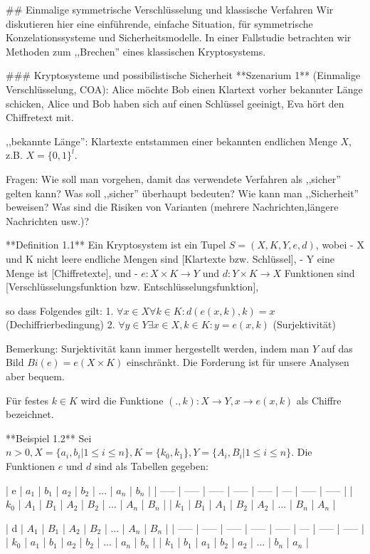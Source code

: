 \documentclass[a4paper]{article}
\begin{document}
\begin{multicols}{3}
## Einmalige symmetrische Verschlüsselung und klassische Verfahren
Wir diskutieren hier eine einführende, einfache Situation, für symmetrische Konzelationssysteme und Sicherheitsmodelle. In einer Fallstudie betrachten wir Methoden zum ,,Brechen'' eines klassischen Kryptosystems.

### Kryptosysteme und possibilistische Sicherheit
**Szenarium 1** (Einmalige Verschlüsselung, COA): Alice möchte Bob einen Klartext vorher bekannter Länge schicken, Alice und Bob haben sich auf einen Schlüssel geeinigt, Eva hört den Chiffretext mit.

,,bekannte Länge'': Klartexte entstammen einer bekannten endlichen Menge $X$, z.B. $X=\{0,1\}^l$.

Fragen: Wie soll man vorgehen, damit das verwendete Verfahren als ,,sicher'' gelten kann? Was soll ,,sicher'' überhaupt bedeuten? Wie kann man ,,Sicherheit'' beweisen? Was sind die Risiken von Varianten (mehrere Nachrichten,längere Nachrichten usw.)?

**Definition 1.1** Ein Kryptosystem ist ein Tupel $S=(X,K,Y,e,d)$, wobei
- X und K nicht leere endliche Mengen sind [Klartexte bzw. Schlüssel],
- Y eine Menge ist [Chiffretexte], und
- $e:X\times K\rightarrow Y$ und $d:Y\times K\rightarrow X$ Funktionen sind [Verschlüsselungsfunktion bzw. Entschlüsselungsfunktion],

so dass Folgendes gilt:
1. $\forall x\in X\forall k\in K:d(e(x,k),k) =x$ (Dechiffrierbedingung)
2. $\forall y\in Y\exists x\in X,k\in K:y=e(x,k)$ (Surjektivität)

Bemerkung: Surjektivität kann immer hergestellt werden, indem man $Y$ auf das Bild $Bi(e) =e(X\times K)$ einschränkt. Die Forderung ist für unsere Analysen aber bequem.

Für festes $k\in K$ wird die Funktione $(.,k):X\rightarrow Y,x \rightarrow e(x,k)$ als Chiffre bezeichnet.

**Beispiel 1.2** Sei $n>0, X=\{a_i,b_i| 1\leq i\leq n\},K=\{k_0,k_1\},Y=\{A_i,B_i| 1\leq i\leq n\}$. Die Funktionen $e$ und $d$ sind als Tabellen gegeben:

| e     | $a_1$ | $b_1$ | $a_2$ | $b_2$ | ... | $a_n$ | $b_n$ |
| ----- | ----- | ----- | ----- | ----- | --- | ----- | ----- |
| $k_0$ | $A_1$ | $B_1$ | $A_2$ | $B_2$ | ... | $A_n$ | $B_n$ |
| $k_1$ | $B_1$ | $A_1$ | $B_2$ | $A_2$ | ... | $B_n$ | $A_n$ |

| d     | $A_1$ | $B_1$ | $A_2$ | $B_2$ | ... | $A_n$ | $B_n$ |
| ----- | ----- | ----- | ----- | ----- | --- | ----- | ----- |
| $k_0$ | $a_1$ | $b_1$ | $a_2$ | $b_2$ | ... | $a_n$ | $b_n$ |
| $k_1$ | $b_1$ | $a_1$ | $b_2$ | $a_2$ | ... | $b_n$ | $a_n$ |


\end{multicols}
\end{document}
